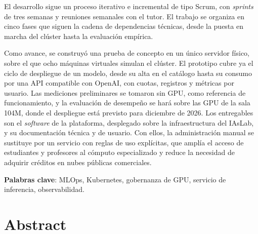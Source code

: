 \documentclass[letterpaper,11pt]{report}
\begin{document}
El desarrollo sigue un proceso iterativo e incremental de tipo Scrum, con \emph{sprints} de tres semanas y reuniones semanales con el tutor. El trabajo se organiza en cinco fases que siguen la cadena de dependencias técnicas, desde la puesta en marcha del clúster hasta la evaluación empírica.

Como avance, se construyó una prueba de concepto en un único servidor físico, sobre el que ocho máquinas virtuales simulan el clúster. El prototipo cubre ya el ciclo de despliegue de un modelo, desde su alta en el catálogo hasta su consumo por una API compatible con OpenAI, con cuotas, registros y métricas por usuario. Las mediciones preliminares se tomaron sin GPU, como referencia de funcionamiento, y la evaluación de desempeño se hará sobre las GPU de la sala 104M, donde el despliegue está previsto para diciembre de 2026. Los entregables son el \emph{software} de la plataforma, desplegado sobre la infraestructura del IAsLab, y su documentación técnica y de usuario. Con ellos, la administración manual se sustituye por un servicio con reglas de uso explícitas, que amplía el acceso de estudiantes y profesores al cómputo especializado y reduce la necesidad de adquirir créditos en nubes públicas comerciales.

\medskip
\noindent \textbf{Palabras clave}: MLOps, Kubernetes, gobernanza de GPU, servicio de inferencia, observabilidad.

\chapter*{Abstract}
\end{document}
